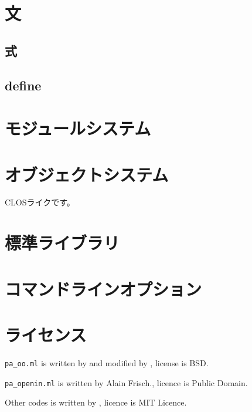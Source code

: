 \documentclass[draft]{article}
\begin{document}
\section{文}
\subsection{式}

\subsection{define}\label{define}

\section{モジュールシステム}
\section{オブジェクトシステム}
CLOSライクです。

\section{標準ライブラリ}

\section{コマンドラインオプション}

\section{ライセンス}
\verb!pa_oo.ml! is written by  and modified by
, license is BSD.

\verb!pa_openin.ml! is written by Alain Frisch., licence is Public Domain.

Other codes is written by , licence is MIT Licence.
\end{document}

